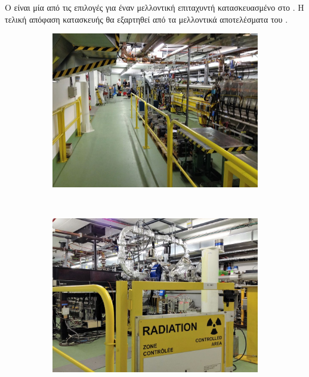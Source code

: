 Ο  είναι μία από τις επιλογές για έναν μελλοντική επιταχυντή κατασκευασμένο στο . 
Η τελική απόφαση κατασκευής θα εξαρτηθεί από τα μελλοντικά αποτελέσματα του .

\begin{figure}[tph]
    \begin{subfigure}{0.5\textwidth}
		\centering
		\includegraphics[width=.9\linewidth]{images/CLIC-CTF3-overview.jpg}
    \end{subfigure}
	~
    \begin{subfigure}{0.5\textwidth}
		\centering
		\includegraphics[width=.9\linewidth]{images/CLIC-CTF3-radiation.jpg}
    \end{subfigure}
	\par\bigskip
    \begin{subfigure}{0.5\textwidth}
		\centering

\end{subfigure}
\end{figure}
